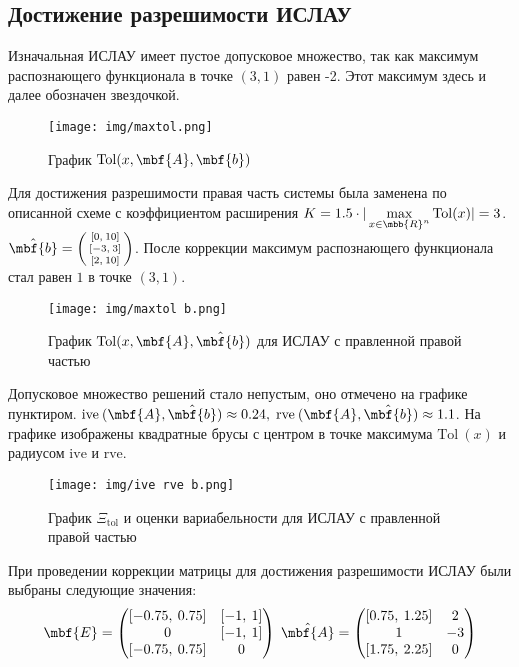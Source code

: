 \documentclass[a4paper]{article}
\begin{document}
\subsection{Достижение разрешимости ИСЛАУ}
Изначальная ИСЛАУ имеет пустое допусковое множество, так как максимум распознающего функционала в точке $(3,1)$ равен -2. Этот максимум здесь и далее обозначен звездочкой.
\begin{figure}[H]
    \centering
    \texttt{[image: img/maxtol.png]}
    \caption{График $\mathrm{Tol}(x,\mbf{A},\mbf{b})$}
    \label{fig:origtol}
\end{figure}
Для достижения разрешимости правая часть системы была заменена по описанной схеме с коэффициентом расширения  $K=1.5\cdot|\max\limits_{x\in\mbb{R}^n}\mathrm{Tol}(x)|=3$. $\hat{\mbf{b}}=\left(\begin{smallmatrix}
    [0,\:10]\\ [-3,\:3]\\ [2,\:10]
    \end{smallmatrix}\right)$. После коррекции максимум распознающего функционала стал равен $1$ в точке $(3,1)$.
\begin{figure}[H]
    \centering
    \texttt{[image: img/maxtol b.png]}
    \caption{График $\mathrm{Tol}(x,\mbf{A}, \hat{\mbf{b}})$ для ИСЛАУ с правленной правой частью}
    \label{fig:btol}
\end{figure}
Допусковое множество решений стало непустым, оно отмечено на графике пунктиром. $\mathrm{ive}\:(\mbf{A}, \hat{\mbf{b}})\approx0.24,\;\mathrm{rve}\:(\mbf{A}, \hat{\mbf{b}})\approx1.1$. На графике изображены квадратные брусы с центром в точке максимума $\mathrm{Tol}\:(x)$ и радиусом $\mathrm{ive}$ и $\mathrm{rve}$.
\begin{figure}[H]
    \centering
    \texttt{[image: img/ive rve b.png]}
    \caption{График $\Xi_{\mathrm{tol}}$ и оценки вариабельности для ИСЛАУ с правленной правой частью}
    \label{fig:biverve}
\end{figure}
При проведении коррекции матрицы для достижения разрешимости ИСЛАУ были выбраны следующие значения:
$$
\mbf{E}=\begin{pmatrix}
[-0.75,\:0.75]&[-1,\:1]\\
0&[-1,\:1]\\
[-0.75,\:0.75]&0
\end{pmatrix}\;
\hat{\mbf{A}}=\begin{pmatrix}
[0.75,\:1.25]&2\\
1&-3\\
[1.75,\:2.25]&0
\end{pmatrix}
$$
\end{document}
